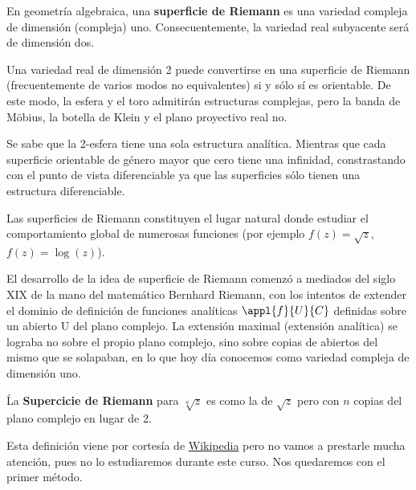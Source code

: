 \documentclass{apuntes}
\begin{document}
\begin{defn}
En geometría algebraica, una \textbf{superficie de Riemann} es una variedad compleja de dimensión (compleja) uno. Consecuentemente, la variedad real subyacente será de dimensión dos.

Una variedad real de dimensión 2 puede convertirse en una superficie de Riemann (frecuentemente de varios modos no equivalentes) si y sólo sí es orientable. De este modo, la esfera y el toro admitirán estructuras complejas, pero la banda de Möbius, la botella de Klein y el plano proyectivo real no.

Se sabe que la 2-esfera tiene una sola estructura analítica. Mientras que cada superficie orientable de género mayor que cero tiene una infinidad, constrastando con el punto de vista diferenciable ya que las superficies sólo tienen una estructura diferenciable.

Las superficies de Riemann constituyen el lugar natural donde estudiar el comportamiento global de numerosas funciones (por ejemplo $f(z)=\sqrt{z}$, $f(z)=\log(z)$).

El desarrollo de la idea de superficie de Riemann comenzó a mediados del siglo XIX de la mano del matemático Bernhard Riemann, con los intentos de extender el dominio de definición de funciones analíticas $\appl{f}{U}{C}$ definidas sobre un abierto U del plano complejo. La extensión maximal (extensión analítica) se lograba no sobre el propio plano complejo, sino sobre copias de abiertos del mismo que se solapaban, en lo que hoy día conocemos como variedad compleja de dimensión uno.

Ĺa \textbf{Supercicie de Riemann} para $\sqrt[n]{z}$ es como la de $\sqrt{z}$ pero con $n$ copias del plano complejo en lugar de 2.
\end{defn}

Esta definición viene por cortesía de \href{http://es.wikipedia.org/wiki/Superficie_de_Riemann}{Wikipedia} pero no vamos a prestarle mucha atención, pues no lo estudiaremos durante este curso. Nos quedaremos con el primer método.
\end{document}
